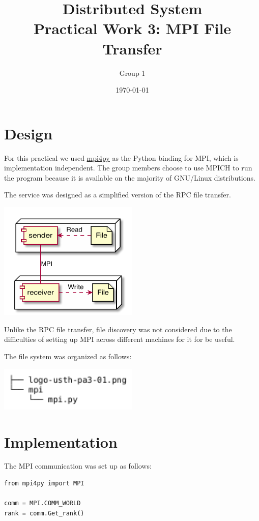 \documentclass{article}
\title{Distributed System\\
       Practical Work 3: MPI File Transfer}
\author{Group 1}
\date{\today}
\begin{document}
\maketitle

\section{Design}
For this practical we used \href{https://mpi4py.readthedocs.io}{mpi4py}
as the Python binding for MPI, which is implementation independent.
The group members choose to use MPICH to run the program because it is available
on the majority of GNU/Linux distributions.

The service was designed as a simplified version of the RPC file transfer.
\begin{center}
  \includegraphics[width=0.5\textwidth]{mpi/arch.pdf}
\end{center}

Unlike the RPC file transfer, file discovery was not considered
due to the difficulties of setting up MPI across different machines
for it for be useful.

The file system was organized as follows:
\begin{center}
  \includegraphics[width=0.5\textwidth]{mpi/files.pdf}
\end{center}
\pagebreak

\section{Implementation}
The MPI communication was set up as follows:
\begin{verbatim}
from mpi4py import MPI

comm = MPI.COMM_WORLD
rank = comm.Get_rank()
\end{verbatim}
\end{document}
